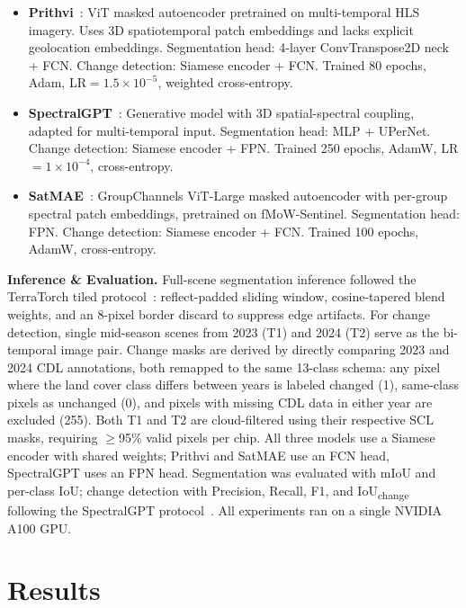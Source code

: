 \documentclass[sigconf, nonacm]{acmart}
\begin{document}
\begin{itemize}[leftmargin=*, itemsep=1pt, topsep=2pt]
  \item \textbf{Prithvi}~\cite{jakubik2023foundation}: ViT
    masked autoencoder pretrained on multi-temporal HLS
    imagery. Uses 3D spatiotemporal patch embeddings and
    lacks explicit geolocation embeddings. Segmentation head:
    4-layer ConvTranspose2D neck + FCN. Change detection:
    Siamese encoder + FCN. Trained 80 epochs, Adam,
    LR$=1.5\!\times\!10^{-5}$, weighted cross-entropy.
  \item \textbf{SpectralGPT}~\cite{hong2024spectralgpt}:
    Generative model with 3D spatial-spectral coupling,
    adapted for multi-temporal input. Segmentation head: MLP
    + UPerNet. Change detection: Siamese encoder + FPN.
    Trained 250 epochs, AdamW, LR$=1\!\times\!10^{-4}$,
    cross-entropy.
  \item \textbf{SatMAE}~\cite{cong2022satmae}: GroupChannels
    ViT-Large masked autoencoder with per-group spectral
    patch embeddings, pretrained on fMoW-Sentinel.
    Segmentation head: FPN. Change detection: Siamese encoder
    + FCN. Trained 100 epochs, AdamW, cross-entropy.
\end{itemize}

\textbf{Inference \& Evaluation.}
Full-scene segmentation inference followed the TerraTorch
tiled protocol~\cite{gomes2025terratorch}: reflect-padded
sliding window, cosine-tapered blend weights, and an
8-pixel border discard to suppress edge artifacts.
For change detection, single mid-season scenes from 2023
(T1) and 2024 (T2) serve as the bi-temporal image pair.
Change masks are derived by directly comparing 2023 and
2024 CDL annotations, both remapped to the same 13-class
schema: any pixel where the land cover class differs
between years is labeled changed (1), same-class pixels
as unchanged (0), and pixels with missing CDL data in
either year are excluded (255). Both T1 and T2 are
cloud-filtered using their respective SCL masks, requiring
$\geq$95\% valid pixels per chip. All three models use a
Siamese encoder with shared weights; Prithvi and SatMAE
use an FCN head, SpectralGPT uses an FPN head.
Segmentation was evaluated with mIoU and per-class
IoU; change detection with Precision, Recall, F1, and
IoU\textsubscript{change} following the SpectralGPT
protocol~\cite{hong2024spectralgpt}. All experiments ran
on a single NVIDIA A100 GPU.

\section{Results}
\end{document}
